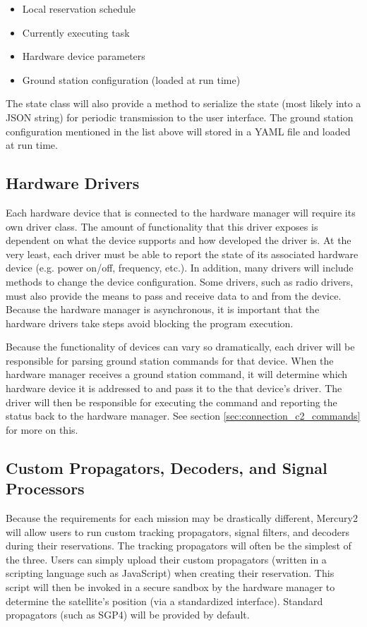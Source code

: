 \documentclass{mxl-design}
\begin{document}
\begin{itemize}
	\item Local reservation schedule
	\item Currently executing task
	\item Hardware device parameters
	\item Ground station configuration (loaded at run time)
\end{itemize}

The state class will also provide a method to serialize the state (most likely into a JSON string) for periodic transmission to the user interface. The ground station configuration mentioned in the list above will stored in a YAML file and loaded at run time.

\subsection{Hardware Drivers}
\label{sec:drivers}
Each hardware device that is connected to the hardware manager will require its own driver class. The amount of functionality that this driver exposes is dependent on what the device supports and how developed the driver is. At the very least, each driver must be able to report the state of its associated hardware device (e.g. power on/off, frequency, etc.). In addition, many drivers will include methods to change the device configuration. Some drivers, such as radio drivers, must also provide the means to pass and receive data to and from the device. Because the hardware manager is asynchronous, it is important that the hardware drivers take steps avoid blocking the program execution.

Because the functionality of devices can vary so dramatically, each driver will be responsible for parsing ground station commands for that device. When the hardware manager receives a ground station command, it will determine which hardware device it is addressed to and pass it to the that device's driver. The driver will then be responsible for executing the command and reporting the status back to the hardware manager. See section \ref{sec:connection_c2_commands} for more on this.

\subsection{Custom Propagators, Decoders, and Signal Processors}
\label{sec:custom_scripts}
Because the requirements for each mission may be drastically different, Mercury2 will allow users to run custom tracking propagators, signal filters, and decoders during their reservations. The tracking propagators will often be the simplest of the three. Users can simply upload their custom propagators (written in a scripting language such as JavaScript) when creating their reservation. This script will then be invoked in a secure sandbox by the hardware manager to determine the satellite's position (via a standardized interface). Standard propagators (such as SGP4) will be provided by default.
\end{document}
